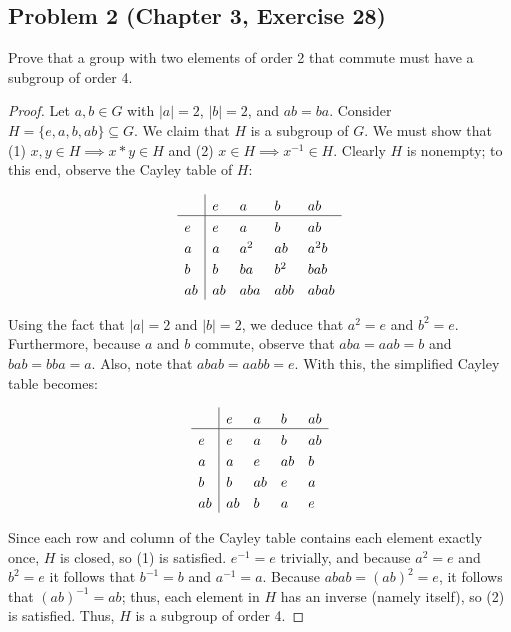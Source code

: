 \documentclass{article}
\begin{document}
\subsection*{Problem 2 (Chapter 3, Exercise 28)}
Prove that a group with two elements of order 2 that commute must have a subgroup of order 4.
\begin{proof}

Let $a, b \in G$ with $|a| = 2$, $|b| = 2$, and $ab = ba$. Consider $H = \{e, a, b, ab\} \subseteq G$. We claim that $H$ is a subgroup of $G$. We must show that (1) $x, y \in H \implies x \ast y \in H$ and (2) $x \in H \implies x^{-1} \in H$. Clearly $H$ is nonempty; to this end, observe the Cayley table of $H$: 

\[
    \setlength{\extrarowheight}{3pt}
    \begin{array}{l|*{4}{l}}
        & e   & a   & b  & ab  \\
    \hline
    e   & e   & a   & b  & ab  \\
    a   & a   & a^2   & ab & a^2b  \\
    b   & b   & ba  & b^2  & bab  \\
    ab  & ab  & aba   & abb  & abab  \\
    \end{array} 
\]

Using the fact that $|a| = 2$ and $|b| = 2$, we deduce that $a^2 = e$ and $b^2 = e$. Furthermore, because $a$ and $b$ commute, observe that $aba = aab = b$ and $bab = bba = a$. Also, note that $abab = aabb = e$. With this, the simplified Cayley table becomes:

\[
    \setlength{\extrarowheight}{3pt}
    \begin{array}{l|*{4}{l}}
        & e   & a   & b  & ab  \\
    \hline
    e   & e   & a   & b  & ab  \\
    a   & a   & e   & ab & b  \\
    b   & b   & ab  & e  & a  \\
    ab  & ab  & b   & a  & e  \\
    \end{array} 
\]

Since each row and column of the Cayley table contains each element exactly once, $H$ is closed, so (1) is satisfied. $e^{-1} = e$ trivially, and because $a^2 = e$ and $b^2 = e$ it follows that $b^{-1} = b$ and $a^{-1} = a$. Because $abab = (ab)^2 = e$, it follows that $(ab)^{-1} = ab$; thus, each element in $H$ has an inverse (namely itself), so (2) is satisfied. Thus, $H$ is a subgroup of order 4.

\end{proof}
\end{document}
